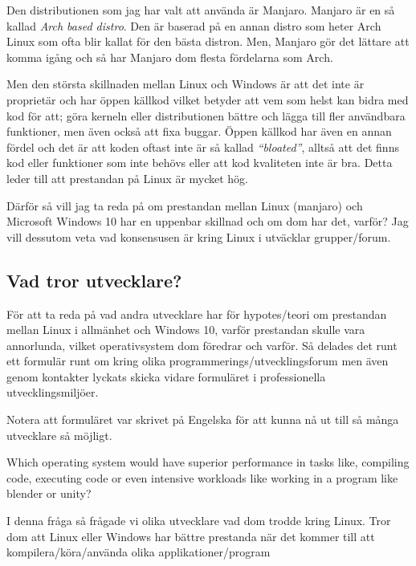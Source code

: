 \documentclass[12pt, a4paper]{report}
\begin{document}
   Den distributionen som jag har valt att använda är Manjaro\cite{manjaro}. Manjaro är en så kallad \textit{Arch based distro}. Den är baserad på en annan distro som heter Arch Linux som ofta blir kallat för den bästa distron. Men, Manjaro gör det lättare att komma igång och så har Manjaro dom flesta fördelarna som Arch.
 
   Men den största skillnaden mellan Linux och Windows är att det inte är proprietär och har öppen källkod vilket betyder att vem som helst kan bidra med kod för att; göra kerneln eller distributionen bättre och lägga till fler användbara funktioner, men även också att fixa buggar. Öppen källkod har även en annan fördel och det är att koden oftast inte är så kallad \textit{``bloated''}, alltså att det finns kod eller funktioner som inte behövs eller att kod kvaliteten inte är bra. Detta leder till att prestandan på Linux är mycket hög.
  
   Därför så vill jag ta reda på om prestandan mellan Linux (manjaro) och Microsoft Windows 10 har en uppenbar skillnad och om dom har det, varför? Jag vill dessutom veta vad konsensusen är kring Linux i utväcklar grupper/forum.
\subsection{Vad tror utvecklare?}
 
   För att ta reda på vad andra utvecklare har för hypotes/teori om prestandan mellan Linux i allmänhet och Windows 10, varför prestandan skulle vara annorlunda, vilket operativsystem dom föredrar och varför.  Så delades det runt ett formulär runt om kring olika programmerings/utvecklingsforum men även genom kontakter lyckats skicka vidare formuläret i professionella utvecklingsmiljöer.
 
   Notera att formuläret var skrivet på Engelska för att kunna nå ut till så många utvecklare så möjligt.
 
 
   \vspace{2.7cm}
 
 
   \large {Which operating system would have superior performance in tasks like, compiling code, executing code or even intensive workloads like working in a program  like blender or unity?}
 
   \vspace{.5cm}
 
   \normalsize I denna fråga så frågade vi olika utvecklare vad dom trodde kring Linux. Tror dom att Linux eller Windows har bättre prestanda när det kommer till att kompilera/köra/använda olika applikationer/program
 
\end{document}
